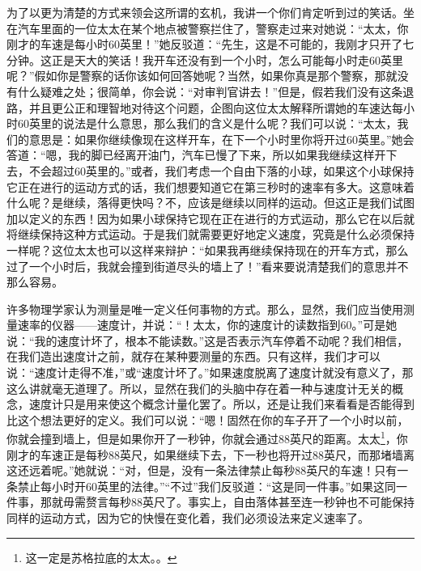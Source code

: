 为了以更为清楚的方式来领会这所谓的玄机，我讲一个你们肯定听到过的笑话。坐在汽车里面的一位太太在某个地点被警察拦住了，警察走过来对她说：“太太，你刚才的车速是每小时60英里！”她反驳道：“先生，这是不可能的，我刚才只开了七分钟。这正是天大的笑话！我开车还没有到一个小时，怎么可能每小时走60英里呢？”假如你是警察的话你该如何回答她呢？当然，如果你真是那个警察，那就没有什么疑难之处；很简单，你会说：“对审判官讲去！”但是，假若我们没有这条退路，并且更公正和理智地对待这个问题，企图向这位太太解释所谓她的车速达每小时60英里的说法是什么意思，那么我们的含义是什么呢？我们可以说：“太太，我们的意思是：如果你继续像现在这样开车，在下一个小时里你将开过60英里。”她会答道：“嗯，我的脚已经离开油门，汽车已慢了下来，所以如果我继续这样开下去，不会超过60英里的。”或者，我们考虑一个自由下落的小球，如果这个小球保持它正在进行的运动方式的话，我们想要知道它在第三秒时的速率有多大。这意味着什么呢？是继续，落得更快吗？不，应该是继续以同样的运动。但这正是我们试图加以定义的东西！因为如果小球保持它现在正在进行的方式运动，那么它在以后就将继续保持这种方式运动。于是我们就需要更好地定义速度，究竟是什么必须保持一样呢？这位太太也可以这样来辩护：“如果我再继续保持现在的开车方式，那么过了一个小时后，我就会撞到街道尽头的墙上了！”看来要说清楚我们的意思并不那么容易。

许多物理学家认为测量是唯一定义任何事物的方式。那么，显然，我们应当使用测量速率的仪器——速度计，并说：“！太太，你的速度计的读数指到60。”可是她说：“我的速度计坏了，根本不能读数。”这是否表示汽车停着不动呢？我们相信，在我们造出速度计之前，就存在某种要测量的东西。只有这样，我们才可以说：“速度计走得不准，”或“速度计坏了。”如果速度脱离了速度计就没有意义了，那这么讲就毫无道理了。所以，显然在我们的头脑中存在着一种与速度计无关的概念，速度计只是用来使这个概念计量化罢了。所以，还是让我们来看看是否能得到比这个想法更好的定义。我们可以说：“嗯！固然在你的车子开了一个小时以前，你就会撞到墙上，但是如果你开了一秒钟，你就会通过88英尺的距离。太太\footnote{这一定是苏格拉底的太太。。}，你刚才的车速正是每秒88英尺，如果继续下去，下一秒也将开过88英尺，而那堵墙离这还远着呢。”她就说：“对，但是，没有一条法律禁止每秒88英尺的车速！只有一条禁止每小时开60英里的法律。”“不过”我们反驳道：“这是同一件事。”如果这同一件事，那就毋需赘言每秒88英尺了。事实上，自由落体甚至连一秒钟也不可能保持同样的运动方式，因为它的快慢在变化着，我们必须设法来定义速率了。

